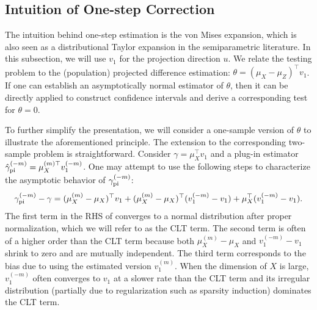 \documentclass[11pt]{article}
\begin{document}
\subsection{Intuition of One-step Correction}\label{section: intuition}

The intuition behind one-step estimation is the von Mises expansion, which is also seen as a distributional Taylor expansion in the semiparametric literature. In this subsection, we will use $v_1$ for the projection direction $u$.  We relate the testing problem to the (population) projected difference estimation:
$\theta=\left(\mu_X-\mu_Z\right)^{\top} v_1$.
If one can establish an asymptotically normal estimator of $\theta$, then it can be directly applied to construct confidence intervals and derive a corresponding test for $\theta = 0$. 

To further simplify the presentation, we will consider a one-sample version of $\theta$ to illustrate the aforementioned principle. The extension to the corresponding two-sample problem is straightforward. Consider $\gamma = \mu_X^\top v_1$ and a plug-in estimator $\hat \gamma_{\rm pi}^{(-m)} = \mu_X^{(m) \top} v_1^{(-m)}$. One may attempt to use the following steps to characterize the asymptotic behavior of $\gamma_{\rm pi}^{(-m)}$:
\begin{equation}\label{eq: example decomposition}
      \gamma_{\rm pi}^{(-m)} - \gamma =  (\mu_X^{(m)} - \mu_X)^\top v_1 +  (\mu_X^{(m)} - \mu_X)^\top(v_1^{(-m)} - v_1)+ \mu_X^\top (v_1^{(-m)} - v_1).
\end{equation}
The first term in the RHS of  converges to a normal distribution after proper normalization, which we will refer to as the CLT term. The second term is often of a higher order than the CLT term because both $\mu_X^{(m)} - \mu_X$ and $v_1^{(-m)} - v_1$ shrink to zero and are mutually independent. The third term corresponds to the bias due to using the estimated version $v_1^{(m)}$. When the dimension of $X$ is large, $v_1^{(-m)}$ often converges to $v_1$ at a slower rate than the CLT term and its irregular distribution (partially due to regularization such as sparsity induction) dominates the CLT term. 
\end{document}
